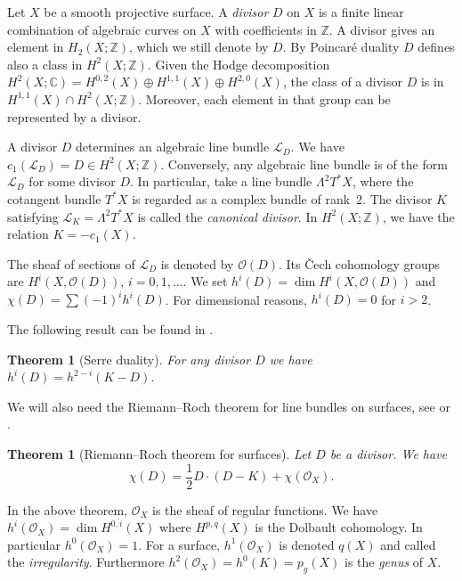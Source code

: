 \documentclass[11pt]{amsart}
\numberwithin{equation}{section}
\theoremstyle{plain}
\newtheorem{theorem}[equation]{Theorem}
\theoremstyle{definition}
\begin{document}
Let $X$ be a smooth projective surface. A \emph{divisor} $D$ on $X$ is a finite linear combination of algebraic curves on $X$
with coefficients in ${\mathbb Z}$. A divisor gives an element in $H_2(X;{\mathbb Z})$, which we still denote by $D$. By Poincar\'e duality $D$ defines
also a class in $H^2(X;{\mathbb Z})$.
Given the Hodge decomposition $H^2(X;{\mathbb C})=H^{0,2}(X)\oplus H^{1,1}(X)\oplus H^{2,0}(X)$, the class of a divisor $D$ is
in $H^{1,1}(X)\cap H^2(X;{\mathbb Z})$. Moreover, each element in that group can be represented by a divisor.

A divisor $D$ determines an algebraic line bundle $\mathcal{L}_D$. We have $c_1(\mathcal{L}_D)=D\in H^2(X;{\mathbb Z})$.
Conversely, any algebraic line bundle is of the 
form $\mathcal{L}_D$ for some divisor $D$.
In particular, take a line bundle $\Lambda^2T^*X$, where the cotangent bundle $T^*X$ is regarded as a complex bundle of rank~2. 
The divisor $K$ satisfying $\mathcal{L}_K=\Lambda^2 T^*X$
is called the \emph{canonical divisor}. In $H^2(X;{\mathbb Z})$, we have the relation $K=-c_1(X)$.

The sheaf of sections of $\mathcal{L}_D$ is denoted by $\mathcal{O}(D)$. 
Its \v{C}ech cohomology groups are $H^i(X,\mathcal{O}(D))$, $i=0,1,\ldots$. We set  $h^i(D)=\dim H^i(X,\mathcal{O}(D))$ and $\chi(D)=\sum (-1)^i h^i(D)$.
For dimensional reasons, $h^i(D)=0$ for $i>2$.
 
The following result can be found in \cite[Theorem I.5.3]{BH}.
\begin{theorem}[Serre duality]\label{thm:serre}
For any divisor $D$ we have $h^i(D)=h^{2-i}(K-D)$.
\end{theorem}

We will also need the Riemann--Roch theorem  for line bundles on surfaces, see \cite[Section I.5]{BH}
or \cite[Chapter IV.1]{GH}.
\begin{theorem}[Riemann--Roch theorem for surfaces]\label{thm:rrsurface}
Let $D$ be a divisor. We have
\[\chi(D)=\frac12D\cdot(D-K)+\chi(\mathcal{O}_X).\]
\end{theorem}
In the above theorem, $\mathcal{O}_X$ is the sheaf of regular functions. We have $h^i(\mathcal{O}_X)=\dim H^{0,i}(X)$ where $H^{p,q}(X)$ is 
the Dolbault cohomology. In particular $h^0(\mathcal{O}_X)=1$.
For a surface, $h^1(\mathcal{O}_X)$ is denoted $q(X)$ and called
the \emph{irregularity}. Furthermore $h^2(\mathcal{O}_X)=h^0(K)=p_g(X)$ is the \emph{genus} of $X$.
\end{document}
